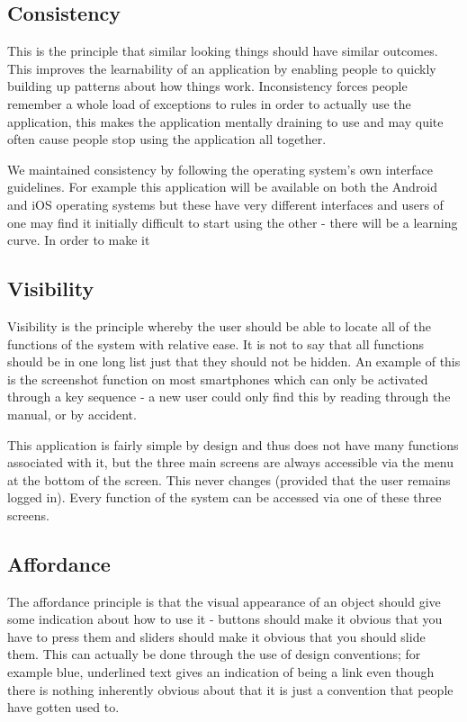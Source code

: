 \documentclass[a4paper]{report}
\begin{document}
{\subsection*{Consistency}
This is the principle that similar looking things should have similar outcomes. This improves the learnability of an application by enabling people to quickly building up patterns about how things work. Inconsistency forces people remember a whole load of exceptions to rules in order to actually use the application, this makes the application mentally draining to use and may quite often cause people stop using the application all together.

We maintained consistency by following the operating system's own interface guidelines. For example this application will be available on both the Android and iOS operating systems but these have very different interfaces and users of one may find it initially difficult to start using the other - there will be a learning curve. In order to make it 
\subsection*{Visibility}
Visibility is the principle whereby the user should be able to locate all of the functions of the system with relative ease. It is not to say that all functions should be in one long list just that they should not be hidden. An example of this is the screenshot function on most smartphones which can only be activated through a key sequence - a new user could only find this by reading through the manual, or by accident.

This application is fairly simple by design and thus does not have many functions associated with it, but the three main screens are always accessible via the menu at the bottom of the screen. This never changes (provided that the user remains logged in). Every function of the system can be accessed via one of these three screens. 

\subsection*{Affordance}
The affordance principle is that the visual appearance of an object should give some indication about how to use it - buttons should make it obvious that you have to press them and sliders should make it obvious that you should slide them. This can actually be done through the use of design conventions; for example blue, underlined text gives an indication of being a link even though there is nothing inherently obvious about that it is just a convention that people have gotten used to.

}
\end{document}
